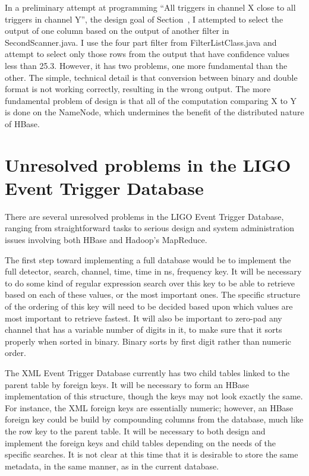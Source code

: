 \documentclass{article}
\begin{document}
In a preliminary attempt at programming ``All triggers in channel X
close to all triggers in channel Y'', the design goal of
Section~\label{query2}, I attempted to select the output of one column
based on the output of another filter in SecondScanner.java. I use the
four part filter from FilterListClass.java and attempt to select only
those rows from the output that have confidence values less than
25.3. However, it has two problems, one more fundamental than the
other. The simple, technical detail is that conversion between binary
and double format is not working correctly, resulting in the wrong
output. The more fundamental problem of design is that all of the
computation comparing X to Y is done on the NameNode, which undermines
the benefit of the distributed nature of HBase. 

\section{Unresolved problems in the LIGO Event Trigger Database}

There are several unresolved problems in the LIGO Event Trigger
Database, ranging from straightforward tasks to serious design and
system administration issues involving both HBase and Hadoop's
MapReduce.

The first step toward implementing a full database would be to
implement the full detector, search, channel, time, time in ns,
frequency key. It will be necessary to do some kind of regular
expression search over this key to be able to retrieve based on each
of these values, or the most important ones. The specific structure of
the ordering of this key will need to be decided based upon which
values are most important to retrieve fastest. It will also be
important to zero-pad any channel that has a variable number of
digits in it, to make sure that it sorts properly when sorted in
binary. Binary sorts by first digit rather than numeric order. 

The XML Event Trigger Database currently has two child tables linked
to the parent table by foreign keys. It will be necessary to form an
HBase implementation of this structure, though the keys may not look
exactly the same. For instance, the XML foreign keys are essentially
numeric; however, an HBase foreign key could be build by compounding
columns from the database, much like the row key to the parent
table. It will be necessary to both design and implement the foreign
keys and child tables depending on the needs of the specific
searches. It is not clear at this time that it is desirable to store
the same metadata, in the same manner, as in the current database.
\end{document}
